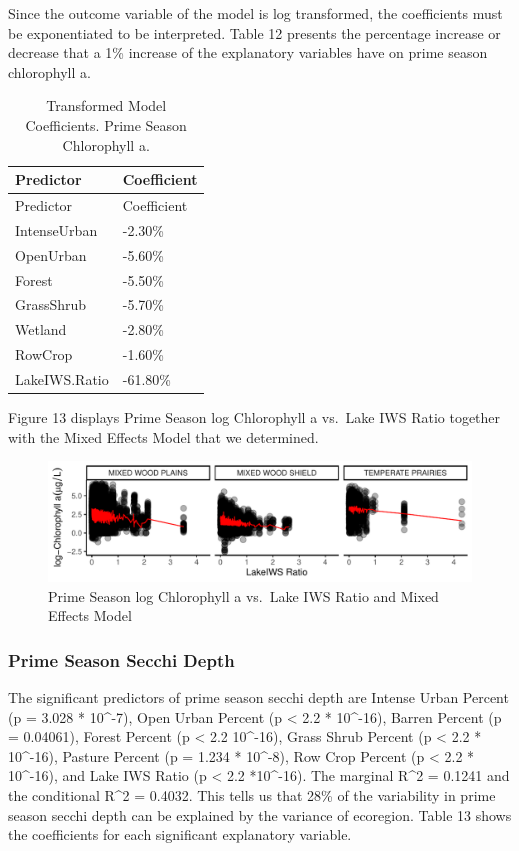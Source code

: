 \documentclass[12pt,]{article}
\begin{document}
Since the outcome variable of the model is log transformed, the
coefficients must be exponentiated to be interpreted. Table 12 presents
the percentage increase or decrease that a 1\% increase of the
explanatory variables have on prime season chlorophyll a.

\newpage

\begin{longtable}[]{@{}ll@{}}
\caption{Transformed Model Coefficients. Prime Season Chlorophyll
a.}\tabularnewline
\toprule
Predictor & Coefficient\tabularnewline
\midrule
\endfirsthead
\toprule
Predictor & Coefficient\tabularnewline
\midrule
\endhead
IntenseUrban & -2.30\%\tabularnewline
OpenUrban & -5.60\%\tabularnewline
Forest & -5.50\%\tabularnewline
GrassShrub & -5.70\%\tabularnewline
Wetland & -2.80\%\tabularnewline
RowCrop & -1.60\%\tabularnewline
LakeIWS.Ratio & -61.80\%\tabularnewline
\bottomrule
\end{longtable}

Figure 13 displays Prime Season log Chlorophyll a vs.~Lake IWS Ratio
together with the Mixed Effects Model that we determined.

\begin{figure}
\centering
\includegraphics{Bollt_Greif_Raby_Roth_Project_Final_files/figure-latex/unnamed-chunk-26-1.pdf}
\caption{Prime Season log Chlorophyll a vs.~Lake IWS Ratio and Mixed
Effects Model}
\end{figure}

\hypertarget{prime-season-secchi-depth}{%
\subsubsection{Prime Season Secchi
Depth}\label{prime-season-secchi-depth}}

The significant predictors of prime season secchi depth are Intense
Urban Percent (p = 3.028 * 10\^{}-7), Open Urban Percent (p \textless{}
2.2 * 10\^{}-16), Barren Percent (p = 0.04061), Forest Percent (p
\textless{} 2.2 10\^{}-16), Grass Shrub Percent (p \textless{} 2.2 *
10\^{}-16), Pasture Percent (p = 1.234 * 10\^{}-8), Row Crop Percent (p
\textless{} 2.2 * 10\^{}-16), and Lake IWS Ratio (p \textless{} 2.2
*10\^{}-16). The marginal R\^{}2 = 0.1241 and the conditional R\^{}2 =
0.4032. This tells us that 28\% of the variability in prime season
secchi depth can be explained by the variance of ecoregion. Table 13
shows the coefficients for each significant explanatory variable.
\end{document}
